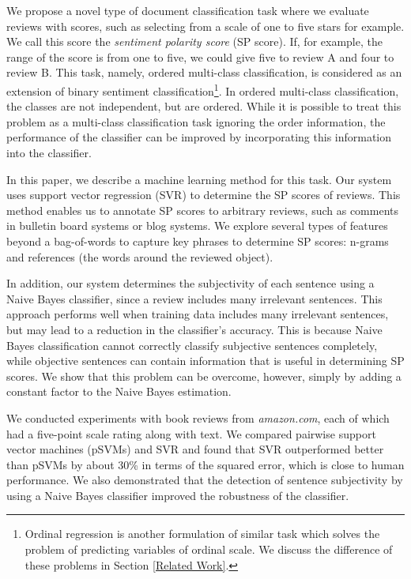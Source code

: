 \documentclass[japanese]{jnlp_1.3d}
\begin{document}
We propose a novel type of document classification task where we evaluate reviews with scores, such as selecting from a scale of one to five stars for example. We call this score the \textit{sentiment polarity score} (SP score). If, for example, the range of the score is from one to five, we could give five to review A and four to review B. This task, namely, ordered multi-class classification, is considered as an extension of binary sentiment classification\footnote{Ordinal regression \cite{Herb98,LargeM2000,Wei2005} is another formulation of similar task which solves the problem of predicting
variables of ordinal scale. We discuss the difference of these problems in Section \ref{Related Work}.}. In ordered multi-class classification, the classes are not independent, but are ordered. While it is possible to treat this problem as a multi-class classification task ignoring the order information, the performance of the classifier can be improved by incorporating this information into the classifier.  

In this paper, we describe a machine learning method for this task. Our system uses support vector regression (SVR) \cite{Vapnik1995} to determine the SP scores of reviews. This method enables us to annotate SP scores to arbitrary reviews, such as comments in bulletin board systems or blog systems. We explore several types of features beyond a bag-of-words to capture key phrases to determine SP scores: n-grams and references (the words around the reviewed object).

In addition, our system determines the subjectivity of each sentence using a Naive Bayes classifier, since a review includes many irrelevant sentences. This approach performs well when training data includes many irrelevant sentences, but may lead to a reduction in the classifier's accuracy.   This is because Naive Bayes classification cannot correctly classify subjective sentences completely, while objective sentences can contain information that is useful in determining SP scores. We show that this problem can be overcome, however, simply by adding a constant factor to the Naive Bayes estimation.

We conducted experiments with book reviews from \textit{amazon.com}, each of which had a five-point scale rating along with text. We compared pairwise support vector machines (pSVMs) and SVR and found that SVR outperformed better than pSVMs by about 30\% in terms of the squared error, which is close to human performance. We also demonstrated that the detection of sentence subjectivity by using a Naive Bayes classifier improved the robustness of the classifier.
\end{document}
